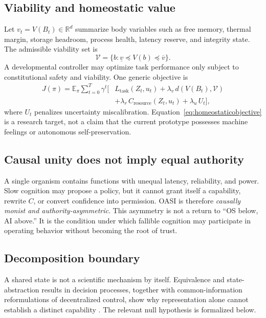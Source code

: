 \documentclass[journal,10pt]{IEEEtran}
\newcommand{\OASI}{\textsc{OASI}}
\begin{document}
\subsection{Viability and homeostatic value}
Let $v_t=V(B_t)\in\mathbb R^d$ summarize body variables such as free memory, thermal margin, storage headroom, process health, latency reserve, and integrity state. The admissible viability set is
\begin{equation}
  \mathcal V=\{b:\underline v\preceq V(b)\preceq\overline v\}. \label{eq:viability}
\end{equation}
A developmental controller may optimize task performance only subject to constitutional safety and viability. One generic objective is
\begin{equation}
\begin{aligned}
J(\pi)=\mathbb E_\pi\sum_{t=0}^{T}\gamma^t \big[
 &L_{\mathrm{task}}(Z_t,u_t)
 +\lambda_v\,d(V(B_t),\mathcal V)\\
 &+\lambda_r\,C_{\mathrm{resource}}(Z_t,u_t)
 +\lambda_u\,U_t \big],
\end{aligned}
\label{eq:homeostaticobjective}
\end{equation}
where $U_t$ penalizes uncertainty miscalibration. Equation~\eqref{eq:homeostaticobjective} is a research target, not a claim that the current prototype possesses machine feelings or autonomous self-preservation.

\subsection{Causal unity does not imply equal authority}
A single organism contains functions with unequal latency, reliability, and power. Slow cognition may propose a policy, but it cannot grant itself a capability, rewrite $C$, or convert confidence into permission. \OASI{} is therefore \emph{causally monist and authority-asymmetric}. This asymmetry is not a return to ``OS below, AI above.'' It is the condition under which fallible cognition may participate in operating behavior without becoming the root of trust.

\subsection{Decomposition boundary}
A shared state is not a scientific mechanism by itself. Equivalence and state-abstraction results in decision processes, together with common-information reformulations of decentralized control, show why representation alone cannot establish a distinct capability \cite{givan2003equivalence,nayyar2013common}. The relevant null hypothesis is formalized below.
\end{document}

